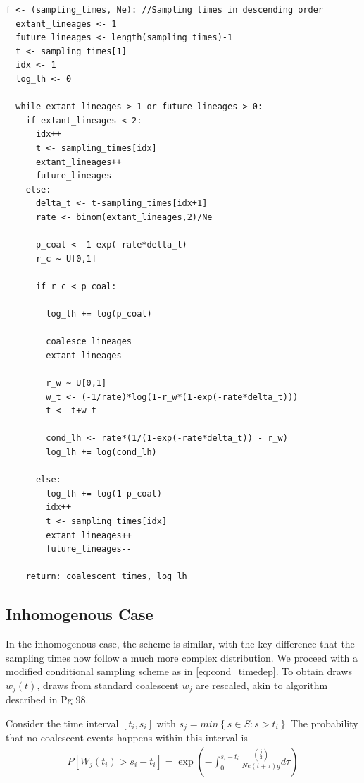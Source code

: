 \documentclass{article}
\theoremstyle{definition}
\begin{document}
\begin{lstlisting}
f <- (sampling_times, Ne): //Sampling times in descending order
  extant_lineages <- 1
  future_lineages <- length(sampling_times)-1
  t <- sampling_times[1]
  idx <- 1
  log_lh <- 0

  while extant_lineages > 1 or future_lineages > 0:
    if extant_lineages < 2:
      idx++
      t <- sampling_times[idx]
      extant_lineages++
      future_lineages--
    else:
      delta_t <- t-sampling_times[idx+1]
      rate <- binom(extant_lineages,2)/Ne

      p_coal <- 1-exp(-rate*delta_t)
      r_c ~ U[0,1] 

      if r_c < p_coal:

        log_lh += log(p_coal)

        coalesce_lineages
        extant_lineages--

        r_w ~ U[0,1]
        w_t <- (-1/rate)*log(1-r_w*(1-exp(-rate*delta_t)))
        t <- t+w_t

        cond_lh <- rate*(1/(1-exp(-rate*delta_t)) - r_w)
        log_lh += log(cond_lh)

      else:
        log_lh += log(1-p_coal)
        idx++
        t <- sampling_times[idx]
        extant_lineages++
        future_lineages--

    return: coalescent_times, log_lh
\end{lstlisting}

\subsection{Inhomogenous Case}
In the inhomogenous case, the scheme is similar, with the key difference that the sampling times now follow a much more complex distribution. We proceed with a modified conditional sampling scheme as in \ref{eq:cond_timedep}. To obtain draws $w_j(t)$, draws from standard coalescent $w_j$ are rescaled, akin to algorithm described in \cite{hein_gene_2004} Pg 98.

Consider the time interval $[t_i, s_i]$ with $s_j = min\left\{s\in S : s>t_i\right\}$
The probability that no coalescent events happens within this interval is 
\begin{gather*}
  P[W_j(t_i) > s_i-t_i] = \exp(-\int_0^{s_i-t_i}\frac{\binom{j}{2}}{Ne(t+\tau)g}d\tau)
\end{gather*}
\end{document}
